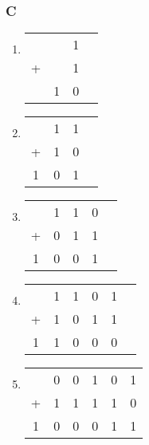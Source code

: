 \documentclass[a4paper]{article}
\begin{document}
  \subsubsection*{C}
  \begin{enumerate}
    \item \begin{tabular}{c@{\,}c@{\,}c@{\,}c}
      & & 1 \\
    + & & 1 \\
    \hline
    & 1 & 0
    \end{tabular}
    \item \begin{tabular}{c@{\,}c@{\,}c@{\,}c}
      & 1 & 1 \\
      + & 1 & 0 \\
      \hline
      1 & 0 & 1
    \end{tabular}
    \item \begin{tabular}{c@{\,}c@{\,}c@{\,}c@{\,}c}
      & 1 & 1 & 0 \\
      + & 0 & 1 & 1 \\
      \hline
      1 & 0 & 0 & 1
    \end{tabular}
    \item \begin{tabular}{c@{\,}c@{\,}c@{\,}c@{\,}c@{\,}c}
      & 1 & 1 & 0 & 1 \\
      + & 1 & 0 & 1 & 1 \\
      \hline
      1 & 1 & 0 & 0 & 0
    \end{tabular}
    \item \begin{tabular}{c@{\,}c@{\,}c@{\,}c@{\,}c@{\,}c}
      & 0 & 0 & 1 & 0 & 1 \\
      + & 1 & 1 & 1 & 1 & 0 \\
      \hline
      1 & 0 & 0 & 0 & 1 & 1 
    \end{tabular}
  \end{enumerate}
\end{document}
